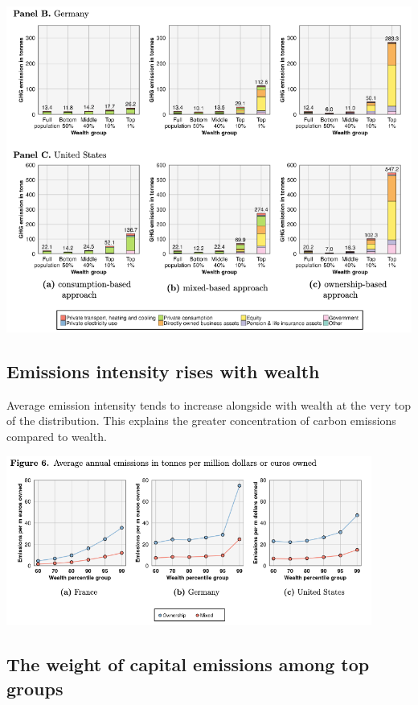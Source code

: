 \documentclass[10pt]{beamer}
\begin{document}
\begin{frame}{\subsecname}
    \includegraphics[width=\textwidth, height=0.9\textheight]{../Figures/F52.png}
\end{frame}

\subsection{Emissions intensity rises with wealth}
\begin{frame}{\subsecname}
    Average emission intensity tends to increase alongside with wealth at the very top of the distribution.
    This explains the greater concentration of carbon emissions compared to wealth.
    \begin{center}
        \includegraphics[width=0.9\textwidth]{../Figures/F6.png}
    \end{center}
\end{frame}

\subsection{The weight of capital emissions among top groups}
\end{document}
